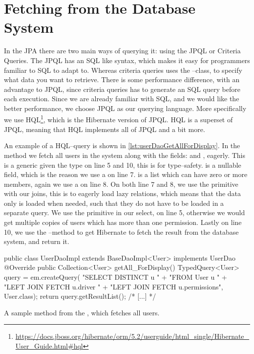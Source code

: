 \section{Fetching from the Database System}\label{subsec:fetchfromdb}
In the \ac{JPA} there are two main ways of querying it: using the \ac{JPQL} or Criteria Queries.
The \ac{JPQL} has an \ac{SQL} like syntax, which makes it easy for programmers familiar to \ac{SQL} to adapt to.
Whereas criteria queries uses the --class, to specify what data you want to retrieve.
There is some performance difference, with an advantage to \ac{JPQL}, since criteria queries has to generate an \ac{SQL} query before each execution\cite{jboss_fetchingstrategies}.
Since we are already familiar with \ac{SQL}, and we would like the better performance, we choose \ac{JPQL} as our querying language.
More specifically we use \ac{HQL}\footnote{\url{https://docs.jboss.org/hibernate/orm/5.2/userguide/html_single/Hibernate_User_Guide.html\#hql}}, which is the Hibernate version of \ac{JPQL}.
\ac{HQL} is a superset of \ac{JPQL}, meaning that \ac{HQL} implements all of \ac{JPQL} and a bit more.

\bigskip
An example of a \ac{HQL}--query is shown in \cref{lst:userDaoGetAllForDisplay}.
In the method  we fetch all users in the system along with the fields:  and , eagerly.
This is a  generic given the type  on line 5 and 10, this is for type--safety.
 is a nullable field, which is the reason we use a  on line 7.
 is a list which can have zero or more members, again we use a  on line 8.
On both line 7 and 8, we use the  primitive with our joins,
this is to eagerly load lazy relations, which means that the data only is loaded when needed, such that they do not have to be loaded in a separate query.
We use the  primitive in our select, on line 5,
otherwise we would get multiple copies of users which has more than one permission.
Lastly on line 10, we use the --method to get Hibernate to fetch the result from the database system, and return it.
\begin{listing}
    \begin{java2}
public class UserDaoImpl extends BaseDaoImpl<User> implements UserDao {
    @Override
    public Collection<User> getAll_ForDisplay() {
        TypedQuery<User> query = em.createQuery(
            "SELECT DISTINCT u " +
                "FROM User u " +
                "LEFT JOIN FETCH u.driver " +
                "LEFT JOIN FETCH u.permissions",
            User.class);
        return query.getResultList();
    }
    /* [...] */
}
    \end{java2}
    \caption{A sample method from the , which fetches all users.}\label{lst:userDaoGetAllForDisplay}
\end{listing}

